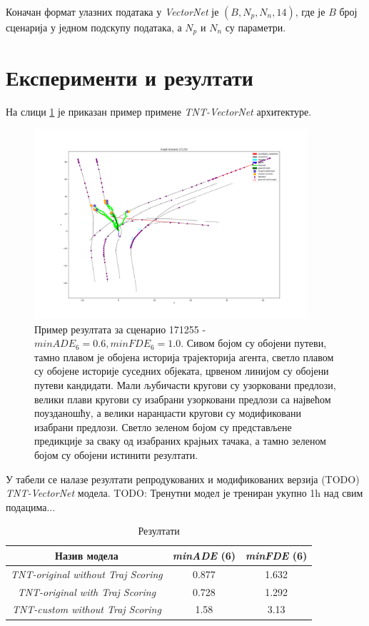 \documentclass[11pt,oneside]{memoir}
\begin{document}
Коначан формат улазних података у \textit{VectorNet} је $(B, N_{p}, N_{n}, 14)$, где је $B$ број сценарија у једном подскупу података,
а $N_{p}$ и $N_{n}$ су параметри.

\section{Експерименти и резултати}

На слици \ref{tnt-scenario-171255} је приказан пример примене \textit{TNT-VectorNet} архитектуре. 

\begin{figure}[H]
  \centering
  \includegraphics[width=0.9\textwidth]{images/tnt-scenario-171255.png}
  \caption{
    Пример резултата за сценарио 171255 - $minADE_{6} = 0.6, minFDE_{6} = 1.0$. Сивом 
    бојом су обојени путеви, тамно плавом је обојена историја трајекторија агента, светло плавом су обојене историје суседних објеката,
    црвеном линијом су обојени путеви кандидати. Мали љубичасти кругови су узорковани предлози, велики плави кругови су изабрани
    узорковани предлози са највећом поузданошћу, а велики наранџасти кругови су модификовани изабрани предлози. Светло зеленом
    бојом су представљене предикције за сваку од изабраних крајњих тачака, а тамно зеленом бојом су обојени истинити резултати. 
    \label{tnt-scenario-171255}
  }
\end{figure}

У табели  се налазе резултати репродукованих и модификованих верзија (TODO) \textit{TNT-VectorNet} модела. TODO: Тренутни модел је трениран укупно 1h над свим подацима...

\begin{table}
  \begin{tabular}{c|c|c}
    Назив модела & \textit{minADE} (6) & \textit{minFDE} (6) \\
    \hline
    \textit{TNT-original without Traj Scoring} & 0.877 & 1.632 \\
    \textit{TNT-original with Traj Scoring} & 0.728 & 1.292 \\
    \textit{TNT-custom without Traj Scoring}  & 1.58 & 3.13
  \end{tabular}
  \caption{Резултати}
  \label{vectornet-results}
\end{table}
\end{document}
